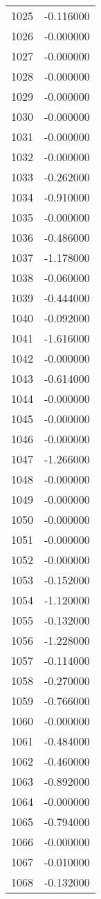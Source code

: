 \documentclass[12pt]{article}
\begin{document}
\begin{longtable}{@{}cc@{}}
1025 & -0.116000 \\
1026 & -0.000000 \\
1027 & -0.000000 \\
1028 & -0.000000 \\
1029 & -0.000000 \\
1030 & -0.000000 \\
1031 & -0.000000 \\
1032 & -0.000000 \\
1033 & -0.262000 \\
1034 & -0.910000 \\
1035 & -0.000000 \\
1036 & -0.486000 \\
1037 & -1.178000 \\
1038 & -0.060000 \\
1039 & -0.444000 \\
1040 & -0.092000 \\
1041 & -1.616000 \\
1042 & -0.000000 \\
1043 & -0.614000 \\
1044 & -0.000000 \\
1045 & -0.000000 \\
1046 & -0.000000 \\
1047 & -1.266000 \\
1048 & -0.000000 \\
1049 & -0.000000 \\
1050 & -0.000000 \\
1051 & -0.000000 \\
1052 & -0.000000 \\
1053 & -0.152000 \\
1054 & -1.120000 \\
1055 & -0.132000 \\
1056 & -1.228000 \\
1057 & -0.114000 \\
1058 & -0.270000 \\
1059 & -0.766000 \\
1060 & -0.000000 \\
1061 & -0.484000 \\
1062 & -0.460000 \\
1063 & -0.892000 \\
1064 & -0.000000 \\
1065 & -0.794000 \\
1066 & -0.000000 \\
1067 & -0.010000 \\
1068 & -0.132000 \\

\end{longtable}
\end{document}
